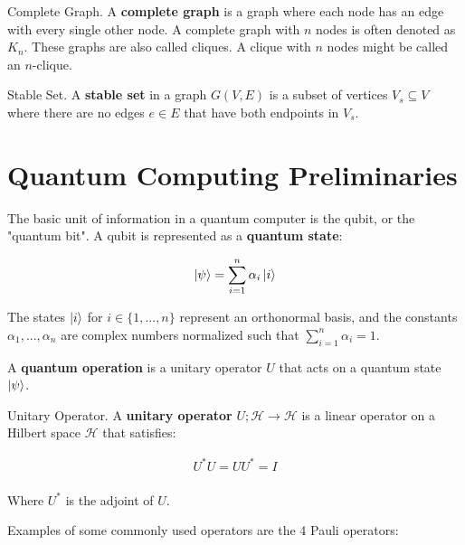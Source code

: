 \begin{definition}{Complete Graph.}
    \label{defn:clique}
    A \textbf{complete graph} is a graph where each node has an edge with every single other node. A complete graph with $n$ nodes is often denoted as $K_n$. These graphs are also called cliques. A clique with $n$ nodes might be called an $n$-clique.
\end{definition}

\begin{definition}{Stable Set.}
    \label{defn:stable-set}
    A \textbf{stable set} in a graph $G(V,E)$ is a subset of vertices $V_s \subseteq  V$ where there are no edges $e \in E$ that have both endpoints in $V_s$.
\end{definition}

\section{Quantum Computing Preliminaries}
\label{sec:qc}

The basic unit of information in a quantum computer is the qubit, or the "quantum bit". A qubit is represented as a \textbf{quantum state}:

\begin{align*}
    \ket{\psi} &= \sum_{i=1}^n \alpha_i\ket{i} \\ 
\end{align*}

The states $\ket{i}$ for $i \in \{1,...,n\}$ represent an orthonormal basis, and the constants $\alpha_1,...,\alpha_n$ are complex numbers normalized such that $\sum_{i=1}^n \alpha_i = 1$.

A \textbf{quantum operation} is a unitary operator $U$ that acts on a quantum state $\ket{\psi}$.

\begin{definition}{Unitary Operator.}
    A \textbf{unitary operator} $U;\mathcal{H} \to \mathcal{H}$ is a linear operator on a Hilbert space $\mathcal{H}$ that satisfies:
    
    \begin{align*}
        U^*U = UU^* = I \\ 
    \end{align*}
    
    Where $U^*$ is the adjoint of $U$.
\end{definition}

Examples of some commonly used operators are the 4 Pauli operators:

